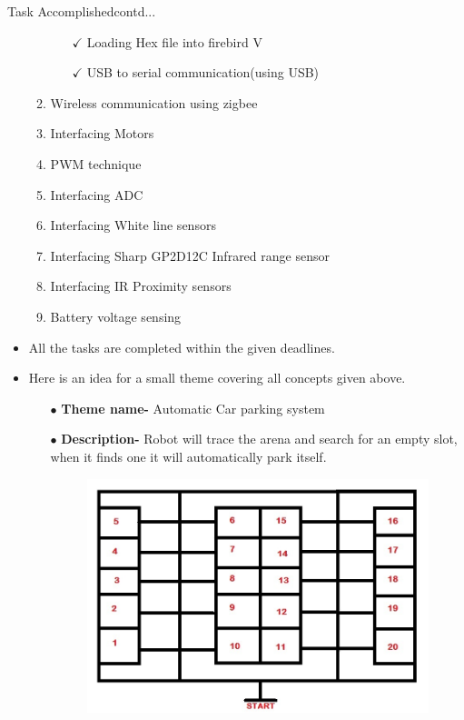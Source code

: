 \documentclass[10pt, a4paper]{beamer}
\begin{document}
\begin{frame}{Task Accomplished}{contd...}
\begin{itemize}
\begin{enumerate}
\begin{itemize}
				\item[$\checkmark$]Loading Hex file into firebird V				   
				\item[$\checkmark$]USB to serial communication(using USB)				
			\end{itemize}
			\vspace{0.4cm}
		    \item Wireless communication using zigbee
		    \framebreak
			\item Interfacing Motors \newline
			\item PWM technique \newline
			\item Interfacing ADC \newline
			\item Interfacing White line sensors \newline
			\item Interfacing Sharp GP2D12C Infrared range sensor \newline
			\item Interfacing IR Proximity sensors \newline
			\item Battery voltage sensing \newline
		\end{enumerate}
		\item All the tasks are completed within the given deadlines.
		\framebreak
		\item Here is an idea for a small theme covering all concepts given above.
		\begin{itemize}
			\item[$\bullet$]\textbf{Theme name- }Automatic Car parking system
			\item[$\bullet$]\textbf{Description- }Robot will trace the arena and search for an empty slot, when it finds one it will automatically park itself.
		\begin{figure}[h]
				\includegraphics[scale=0.35]{arena.jpg}		

\end{figure}
\end{itemize}
\end{itemize}
\end{frame}
\end{document}

